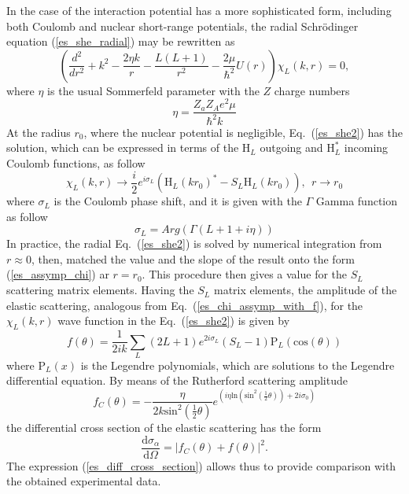 \documentclass[
12pt, %
oneside, %
english, %
doublespacing, %
doublespacing, %
toctotoc, %
parskip, %
headsepline, %
]{MastersDoctoralThesis} %
\begin{document}
In the case of the interaction potential has a more sophisticated form, including both Coulomb and nuclear short-range  potentials, the radial Schr\"{o}dinger equation (\ref{es_she_radial}) may be rewritten as
\begin{equation}
\left(  \frac{d^2}{d r^2} + k^2 - \frac{2 \eta k}{r} - \frac{L(L+1)}{r^2} - \frac{2 \mu}{\hbar^2} U \left( r \right) \right) \chi_L \left( k,r \right) =0,
\label{es_she2}
\end{equation}
where $\eta$ is the usual Sommerfeld parameter with the $Z$ charge numbers
\begin{equation*}
\eta=\frac{Z_a Z_A e^2 \mu}{\hbar^2 k}
\end{equation*}
At the radius $r_0$, where the nuclear potential is negligible, Eq.~(\ref{es_she2}) has the solution, which can be expressed in terms of the $\text{H}_L$ outgoing  and $\text{H}_L^*$ incoming Coulomb functions, as follow
\begin{equation}
\chi_L \left( k,r \right) \rightarrow \frac{i}{2}e^{i \sigma_L} \left( \text{H}_L(kr_0)^*
-S_L \text{H}_L(kr_0)\right), 
~~ r \rightarrow r_0
\label{es_assymp_chi}
\end{equation} 
where $\sigma_L$ is the Coulomb phase shift, and it is given with the $\Gamma$ Gamma function as follow
\begin{equation*}
\sigma_L=Arg\left( \Gamma \left( L+1+i \eta \right) \right)
\end{equation*}
In practice, the radial Eq.~(\ref{es_she2}) is solved by numerical integration from $r \approx 0$, then, matched the value and the slope of the result onto the form (\ref{es_assymp_chi}) ar $r=r_0$. This procedure then gives a value for the $S_L$ scattering matrix elements. Having the $S_L$ matrix elements, the amplitude  of the elastic scattering, analogous  from Eq.~(\ref{es_chi_assymp_with_f}), for the $\chi_L \left( k,r \right)$ wave function in the Eq.~(\ref{es_she2}) is given by
\begin{equation}
f(\theta)=\frac{1}{2ik} \sum_{L} (2L+1) e^{2i\sigma_L} \left( S_L - 1 \right)
\text{P}_L(\text{cos}(\theta))
\label{es_amplitude_nuclear}
\end{equation}
where $\text{P}_L(x)$ is the Legendre polynomials, which are solutions to the Legendre differential equation.
By means of the Rutherford scattering amplitude 
\begin{equation}
f_C(\theta)=-\frac{\eta}{2 k {\text{sin}}^2 \left( \tfrac{1}{2} \theta \right) }
e^{\left( i \eta \text{ln}\left( \text{sin}^2 \left( \tfrac{1}{2} \theta \right) \right)
+2i \sigma_{0} \right)}
\end{equation}
the differential cross section of the elastic scattering has the form
\begin{equation}
\frac{\text{d} \sigma_{\alpha}}{\text{d} \Omega} = \vert f_C(\theta) + f(\theta) \vert^2.
\label{es_diff_cross_section}
\end{equation} 
The expression (\ref{es_diff_cross_section}) allows thus to provide comparison with the obtained  experimental data.   
\end{document}
